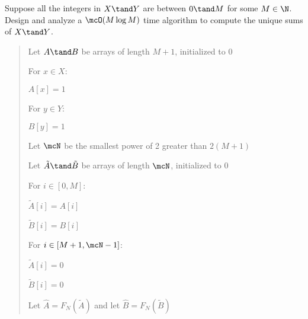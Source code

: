\documentclass[10pt]{article}
\begin{document}
\begin{subexercise}
  \item Suppose all the integers in \( X\tand Y \) are between \( 0\tand M \) for some \( M\in \N \). Design and analyze a \( \mcO(M\log M) \) time algorithm to compute the unique sums of \( X\tand Y \).
\end{subexercise}

\begin{quote}


\begin{steps}
  \item Let \( A \tand B \) be arrays of length \( M+1 \), initialized to 0
  \item For \( x \in X \): 
  \begin{steps}
    \item \( A[x] = 1 \)
  \end{steps}
  \item For \( y \in Y \): 
  \begin{steps}
    \item \( B[y] = 1 \)
  \end{steps}
  \item Let \( \mcN \) be the smallest power of 2 greater than \( 2(M+1) \)
  \item Let \( \tilde A \tand \tilde B \) be arrays of length \( \mcN \), initialized to 0
  \item For \( i \in [0,M] \): 
  \begin{steps}
    \item \( \tilde A[i] = A[i] \)
    \item \( \tilde B[i] = B[i] \)
  \end{steps}
  \item For \( i \in [M+1,\mcN-1] \): 
  \begin{steps}
    \item \( \tilde A[i] = 0 \)
    \item \( \tilde B[i] = 0 \)
  \end{steps}

  \item Let \( \hat A = F_N(\tilde A) \) and let \( \hat B = F_N(\tilde B) \) 


\end{steps}
\end{quote}
\end{document}
